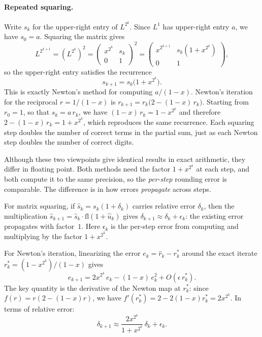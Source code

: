 \documentclass{article}
\begin{document}
\paragraph{Repeated squaring.}
Write $s_k$ for the upper-right entry of $L^{2^k}$. Since $L^1$ has upper-right entry $a$, we have $s_0 = a$. Squaring the matrix gives
\begin{equation}
  L^{2^{k+1}} = (L^{2^k})^2
  = \begin{pmatrix} x^{2^k} & s_k \\ 0 & 1 \end{pmatrix}^2
  = \begin{pmatrix} x^{2^{k+1}} & s_k(1 + x^{2^k}) \\ 0 & 1 \end{pmatrix},
\end{equation}
so the upper-right entry satisfies the recurrence
\begin{equation}
  s_{k+1} = s_k\bigl(1 + x^{2^k}\bigr).
\end{equation}
This is exactly Newton's method for computing $a/(1-x)$. Newton's iteration for the reciprocal $r = 1/(1-x)$ is $r_{k+1} = r_k\bigl(2 - (1-x)\,r_k\bigr)$. Starting from $r_0 = 1$, so that $s_k = a\,r_k$, we have $(1-x)\,r_k = 1 - x^{2^k}$ and therefore $2 - (1-x)\,r_k = 1 + x^{2^k}$, which reproduces the same recurrence. Each squaring step doubles the number of correct terms in the partial sum, just as each Newton step doubles the number of correct digits.

Although these two viewpoints give identical results in exact arithmetic, they differ in floating point. Both methods need the factor $1 + x^{2^k}$ at each step, and both compute it to the same precision, so the \emph{per-step} rounding error is comparable. The difference is in how errors \emph{propagate} across steps.

For matrix squaring, if $\hat s_k = s_k(1 + \delta_k)$ carries relative error $\delta_k$, then the multiplication $\hat s_{k+1} = \hat s_k \cdot \mathrm{fl}(1 + \hat u_k)$ gives $\delta_{k+1} \approx \delta_k + \epsilon_k$: the existing error propagates with factor~$1$. Here $\epsilon_k$ is the per-step error from computing and multiplying by the factor $1 + x^{2^k}$.

For Newton's iteration, linearizing the error $e_k = \hat r_k - r_k^*$ around the exact iterate $r_k^* = (1-x^{2^k})/(1-x)$ gives
\begin{equation}
  e_{k+1} = 2x^{2^k}\, e_k - (1-x)\,e_k^2 + O(\epsilon\, r_k^*).
\end{equation}
The key quantity is the derivative of the Newton map at $r_k^*$: since $f(r) = r(2 - (1-x)r)$, we have $f'(r_k^*) = 2 - 2(1-x)r_k^* = 2x^{2^k}$. In terms of relative error:
\begin{equation}
  \delta_{k+1} \approx \frac{2x^{2^k}}{1 + x^{2^k}}\,\delta_k + \epsilon_k.
\end{equation}
\end{document}
